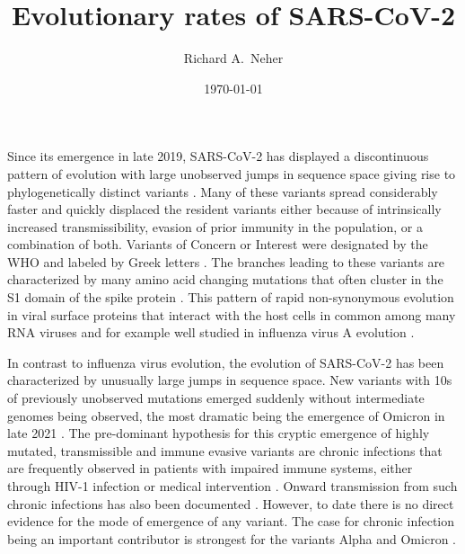 \documentclass[aps,rmp, twocolumn]{revtex4}
\begin{document}
\title{Evolutionary rates of SARS-CoV-2}
\author{Richard A.~Neher}
\date{\today}
\maketitle

Since its emergence in late 2019, SARS-CoV-2 has displayed a discontinuous pattern of evolution with large unobserved jumps in sequence space giving rise to phylogenetically distinct variants \citep{hodcroft_spread_2021,volz_assessing_2021,tegally_detection_2021,faria_genomics_2021,naveca_covid-19_2021,viana_rapid_2022}.
Many of these variants spread considerably faster and quickly displaced the resident variants either because of intrinsically increased transmissibility, evasion of prior immunity in the population, or a combination of both.
Variants of Concern or Interest were designated by the WHO and labeled by Greek letters \citep{konings_sars-cov-2_2021}.
The branches leading to these variants are characterized by many amino acid changing mutations that often cluster in the S1 domain of the spike protein \citep{kistler_rapid_2022}.
This pattern of rapid non-synonymous evolution in viral surface proteins that interact with the host cells in common among many RNA viruses and for example well studied in influenza virus A evolution \citep{bhatt_genomic_2011,strelkowa_clonal_2012}.

In contrast to influenza virus evolution, the evolution of SARS-CoV-2 has been characterized by unusually large jumps in sequence space.
New variants with 10s of previously unobserved mutations emerged suddenly without intermediate genomes being observed, the most dramatic being the emergence of Omicron in late 2021 \citep{viana_rapid_2022}.
The pre-dominant hypothesis for this cryptic emergence of highly mutated, transmissible and immune evasive variants are chronic infections that are frequently observed in patients with impaired immune systems, either through HIV-1 infection \citep{cele_sars-cov-2_2022} or medical intervention \citep{choi_persistence_2020,kemp_sars-cov-2_2021}.
Onward transmission from such chronic infections has also been documented \citep{gonzalez-reiche_intrahost_2022}.
However, to date there is no direct evidence for the mode of emergence of any variant.
The case for chronic infection being an important contributor is strongest for the variants Alpha and Omicron
\citep{hill_origins_2022}.
\end{document}
